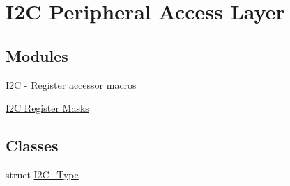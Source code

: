 \hypertarget{group__I2C__Peripheral__Access__Layer}{}\section{I2C Peripheral Access Layer}
\label{group__I2C__Peripheral__Access__Layer}
\subsection*{Modules}
\begin{DoxyCompactItemize}
\item 
\hyperlink{group__I2C__Register__Accessor__Macros}{I2\+C -\/ Register accessor macros}
\item 
\hyperlink{group__I2C__Register__Masks}{I2\+C Register Masks}
\end{DoxyCompactItemize}
\subsection*{Classes}
\begin{DoxyCompactItemize}
\item 
struct \hyperlink{structI2C__Type}{I2\+C\+\_\+\+Type}
\end{DoxyCompactItemize}
